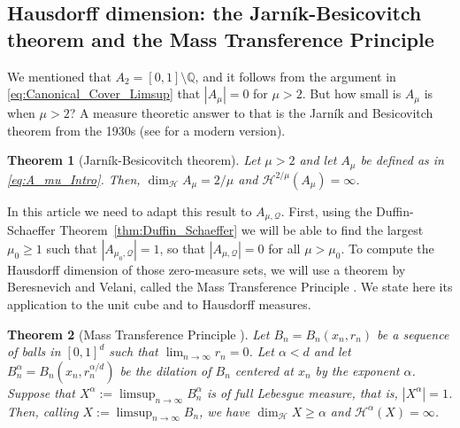 \documentclass[11pt,reqno]{amsart}
\newtheorem{thm}{Theorem}[section]
\theoremstyle{definition}
\begin{document}
\subsection{Hausdorff dimension: the Jarn\'ik-Besicovitch theorem and the Mass Transference Principle}

We mentioned that 
$A_2 = [0,1] \setminus \mathbb Q$, 
and it follows from the argument in \eqref{eq:Canonical_Cover_Limsup}
 that $|A_\mu| = 0$ for $\mu > 2$. 
But how small is $A_\mu$ is when $\mu > 2$?
A measure theoretic answer to that is the Jarn\'ik and Besicovitch theorem from the 1930s (see \cite[Section 10.3]{Falconer2014} for a modern version).
\begin{thm}[Jarn\'ik-Besicovitch theorem]\label{thm:Jarnik_Besicovitch}
Let $\mu > 2$ and let $A_\mu$ be defined as in \eqref{eq:A_mu_Intro}. 
Then, $\operatorname{dim}_{\mathcal H} A_\mu = 2/ \mu$ and $\mathcal H^{2/\mu}(A_\mu) = \infty$. 
\end{thm}

In this article we need to adapt this result to $A_{\mu,\mathcal Q}$. 
First, using the Duffin-Schaeffer Theorem~\ref{thm:Duffin_Schaeffer} we will be able to find the largest $\mu_0 \geq 1$ such that $|A_{\mu_0, \mathcal Q}| = 1$, 
so that $|A_{\mu, \mathcal Q}| = 0$ for all $\mu > \mu_0$. 
To compute the Hausdorff dimension of those zero-measure sets, 
we will use a theorem by Beresnevich and Velani, called the Mass Transference Principle \cite[Theorem 2]{BeresnevichVelani2006}. 
We state here its application to the unit cube and to Hausdorff measures. 
\begin{thm}[Mass Transference Principle \cite{BeresnevichVelani2006}]\label{thm:Mass_Transference_Principle}
Let $B_n = B_n(x_n,r_n)$ be a sequence of balls in $[0,1]^d$ 
such that $\lim_{n \to \infty} r_n = 0$. 
Let $\alpha < d$ and let $B_n^\alpha = B_n(x_n,r_n^{\alpha/d})$ be the dilation of $B_n$ centered at $x_n$ by the exponent $\alpha$. Suppose that $ X^\alpha := \limsup_{n \to \infty} B_n^\alpha $ is of full Lebesgue measure, that is, 
$|X^\alpha| = 1$. 
Then, calling $X := \limsup_{n \to \infty} B_n$, we have $\operatorname{dim}_{\mathcal H} X \geq \alpha$ 
and $\mathcal H^\alpha( X ) = \infty$. 
\end{thm}
\end{document}
